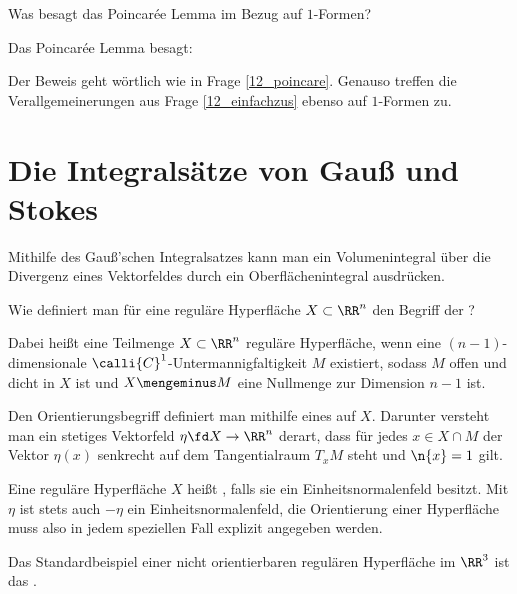 \begin{frage}
  Was besagt das Poincar\'e\sch e Lemma im Bezug auf $1$-Formen?
\end{frage} 

\begin{antwort}
  Das Poincar\'e\sch e Lemma besagt: 

  \medskip%
  \noindent%

  \medskip
  \noindent%
  Der Beweis geht wörtlich wie in Frage \ref{12_poincare}. 
  Genauso treffen die Verallgemeinerungen aus Frage 
  \ref{12_einfachzus} ebenso auf $1$-Formen zu.\AntEnd 
\end{antwort}


\section{Die Integralsätze von Gauß und Stokes}


Mithilfe des Gauß'schen Integralsatzes kann man ein 
Volumenintegral über die Divergenz eines Vektorfeldes 
durch ein Oberflächenintegral ausdrücken.

\begin{frage}
  Wie definiert man für eine reguläre Hyperfläche $X \subset \RR^n$ den 
  Begriff der ? 

  Dabei heißt eine Teilmenge $X\subset\RR^n$ reguläre Hyperfläche, wenn eine 
  $(n-1)$-dimensionale $\calli{C}^1$-Untermannigfaltigkeit $M$ existiert, sodass 
  $M$ offen und dicht in $X$ ist und $X\mengeminus M$ eine Nullmenge zur Dimension $n-1$ ist.
\end{frage}

\begin{antwort}
  Den Orientierungsbegriff definiert man 
  mithilfe eines  
  auf $X$. Darunter versteht man ein stetiges Vektorfeld 
  $\eta\fd X\to\RR^n$ derart, dass für jedes $x\in X\cap M$ der Vektor 
  $\eta(x)$ senkrecht auf dem Tangentialraum 
  $T_x M$ steht und $\n{x}=1$ gilt.

  Eine reguläre Hyperfläche $X$ heißt , falls 
  sie ein Einheitsnormalenfeld besitzt. 
  Mit $\eta$ ist stets auch $-\eta$ ein 
  Einheitsnormalenfeld, die Orientierung 
  einer Hyperfläche muss also in jedem speziellen Fall explizit angegeben werden.  

  Das Standardbeispiel einer nicht orientierbaren regulären Hyperfläche 
  im $\RR^3$ ist das .\AntEnd
\end{antwort}



